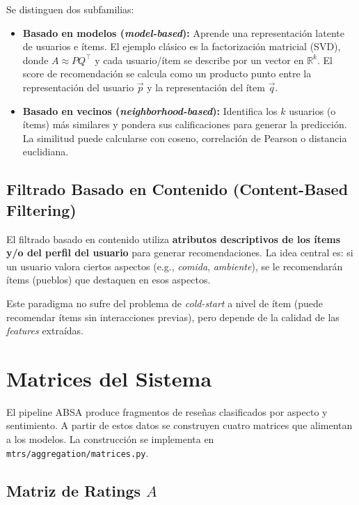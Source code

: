 \documentclass[11pt, a4paper]{article}
\begin{document}
Se distinguen dos subfamilias:

\begin{itemize}
    \item \textbf{Basado en modelos (\textit{model-based}):} Aprende una representación latente de usuarios e ítems. El ejemplo clásico es la factorización matricial (SVD), donde $A \approx P Q^\top$ y cada usuario/ítem se describe por un vector en $\mathbb{R}^k$. El score de recomendación se calcula como un producto punto entre la representación del usuario $\vec{p}$ y la representación del ítem $\vec{q}$.
    \item \textbf{Basado en vecinos (\textit{neighborhood-based}):} Identifica los $k$ usuarios (o ítems) más similares y pondera sus calificaciones para generar la predicción. La similitud puede calcularse con coseno, correlación de Pearson o distancia euclidiana.
\end{itemize}

\subsection{Filtrado Basado en Contenido (Content-Based Filtering)}

El filtrado basado en contenido utiliza \textbf{atributos descriptivos de los ítems y/o del perfil del usuario} para generar recomendaciones. La idea central es: si un usuario valora ciertos aspectos (e.g., \textit{comida}, \textit{ambiente}), se le recomendarán ítems (pueblos) que destaquen en esos aspectos.

Este paradigma no sufre del problema de \textit{cold-start} a nivel de ítem (puede recomendar ítems sin interacciones previas), pero depende de la calidad de las \textit{features} extraídas.

\section{Matrices del Sistema}

El pipeline ABSA produce fragmentos de reseñas clasificados por aspecto y sentimiento. A partir de estos datos se construyen cuatro matrices que alimentan a los modelos. La construcción se implementa en \texttt{mtrs/aggregation/matrices.py}.

\subsection{Matriz de Ratings $A$}
\end{document}
